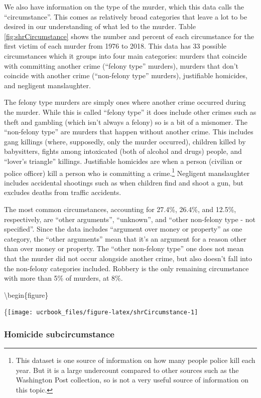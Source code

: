 \documentclass[
  12pt,
  openany]{book}
\begin{document}
We also have information on the type of the murder, which this data calls the ``circumstance''. This comes as relatively broad categories that leave a lot to be desired in our understanding of what led to the murder. Table \ref{fig:shrCircumstance} shows the number and percent of each circumstance for the first victim of each murder from 1976 to 2018. This data has 33 possible circumstances which it groups into four main categories: murders that coincide with committing another crime (``felony type'' murders), murders that don't coincide with another crime (``non-felony type'' murders), justifiable homicides, and negligent manslaughter.

The felony type murders are simply ones where another crime occurred during the murder. While this is called ``felony type'' it does include other crimes such as theft and gambling (which isn't always a felony) so is a bit of a misnomer. The ``non-felony type'' are murders that happen without another crime. This includes gang killings (where, supposedly, only the murder occurred), children killed by babysitters, fights among intoxicated (both of alcohol and drugs) people, and ``lover's triangle'' killings. Justifiable homicides are when a person (civilian or police officer) kill a person who is committing a crime.\footnote{This dataset is one source of information on how many people police kill each year. But it is a large undercount compared to other sources such as the Washington Post collection, so is not a very useful source of information on this topic.} Negligent manslaughter includes accidental shootings such as when children find and shoot a gun, but excludes deaths from traffic accidents.

The most common circumstances, accounting for 27.4\%, 26.4\%, and 12.5\%, respectively, are ``other arguments'', ``unknown'', and ``other non-felony type - not specified''. Since the data includes ``argument over money or property'' as one category, the ``other arguments'' mean that it's an argument for a reason other than over money or property. The ``other non-felony type'' one does not mean that the murder did not occur alongside another crime, but also doesn't fall into the non-felony categories included. Robbery is the only remaining circumstance with more than 5\% of murders, at 8\%.

\textbackslash begin\{figure\}

\{\centering \texttt{[image: ucrbook\_files/figure-latex/shrCircumstance-1]}

\hypertarget{homicide-subcircumstance}{%
\subsubsection{Homicide subcircumstance}\label{homicide-subcircumstance}}
\end{document}
